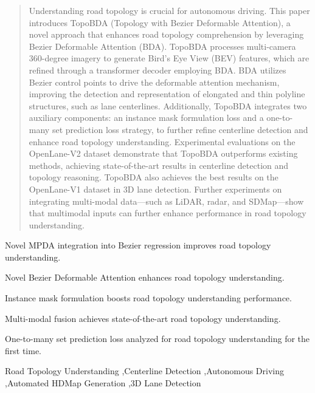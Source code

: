 \documentclass[preprint,12pt]{elsarticle}
\begin{document}
\begin{frontmatter}
\begin{abstract}
Understanding road topology is crucial for autonomous driving. This paper introduces TopoBDA (Topology with Bezier Deformable Attention), a novel approach that enhances road topology comprehension by leveraging Bezier Deformable Attention (BDA). TopoBDA processes multi-camera 360-degree imagery to generate Bird’s Eye View (BEV) features, which are refined through a transformer decoder employing BDA. BDA utilizes Bezier control points to drive the deformable attention mechanism, improving the detection and representation of elongated and thin polyline structures, such as lane centerlines. Additionally, TopoBDA integrates two auxiliary components: an instance mask formulation loss and a one-to-many set prediction loss strategy, to further refine centerline detection and enhance road topology understanding. Experimental evaluations on the OpenLane-V2 dataset demonstrate that TopoBDA outperforms existing methods, achieving state-of-the-art results in centerline detection and topology reasoning. TopoBDA also achieves the best results on the OpenLane-V1 dataset in 3D lane detection. Further experiments on integrating multi-modal data—such as LiDAR, radar, and SDMap—show that multimodal inputs can further enhance performance in road topology understanding.
\end{abstract}


\begin{highlights}
\item Novel MPDA integration into Bezier regression improves road topology understanding.
\item Novel Bezier Deformable Attention enhances road topology understanding.
\item Instance mask formulation boosts road topology understanding performance.
\item Multi-modal fusion achieves state-of-the-art road topology understanding.
\item One-to-many set prediction loss analyzed for road topology understanding for the first time.
\end{highlights}

\begin{keyword}


Road Topology Understanding \sep Centerline Detection \sep Autonomous Driving \sep Automated HDMap Generation \sep 3D Lane Detection

\end{keyword}

\end{frontmatter}
\end{document}
